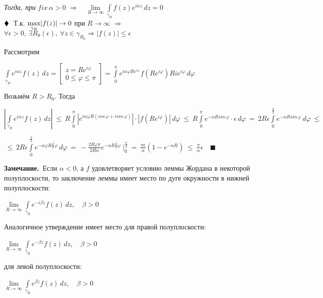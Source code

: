 \documentclass[a4paper, 12pt]{report}
\begin{document}
\bigskip \\  \textit{Тогда, при} $fix\,\alpha > 0$ \quad $\Rightarrow \quad \lim\limits_{R \rightarrow \infty} \int\limits_{\gamma_{R}} f(z)e^{i\alpha z}\, dz = 0$ 
\bigskip \\
$\blacklozenge \hspace{1 mm}$ Т.к. $\smash{\displaystyle\max_{\gamma_{R}}} |f(z)| \rightarrow 0$ при $R \rightarrow \infty$ \quad $\Rightarrow$ \ 
$\forall \epsilon > 0,\ \exists R_0(\epsilon), \ \forall z \in \gamma_{R_0} \Rightarrow |f(z)| \le \epsilon$ \par\bigskip
Рассмотрим 
\begin{center}
    $\int\limits_{\gamma_{R}} e^{i\alpha z}f(z)\, dz = \begin{bmatrix} z = Re^{i\varphi} \\ 0 \le \varphi \le \pi \end{bmatrix} = \int\limits_{0}^{\pi} e^{i \alpha\varphi R e^{i\varphi}}f(R e^{i\varphi}) R i e^{i\varphi}\, d\varphi$
\end{center}
\par Возьмём $R > R_0$. Тогда 
\begin{center}
    $|\int\limits_{\gamma_{R}} e^{i\alpha z}f(z)\, dz|\ \le\  R\int\limits_{0}^{\pi} |e^{i \alpha\varphi R (cos\,\varphi + i sin\,\varphi)}|\cdot|f(R e^{i\varphi})|\, d\varphi\  \le\ R\int\limits_{0}^{\pi} e^{- \alpha R sin\,\varphi}\cdot \epsilon\, d\varphi\ =\ 2R\epsilon \int\limits_{0}^{\frac{\pi}{2}} e^{- \alpha R sin\,\varphi}\, d\varphi\ \le\ $\par[по лемме 1]$\ \le
    \ 2R\epsilon \int\limits_{0}^{\frac{\pi}{2}} e^{- \alpha\varphi R \frac{2}{\pi}\varphi}\, d\varphi\ =\ -\frac{2R\varphi\pi}{2R\alpha} e^{-\alpha R \frac{2}{\pi} \varphi}\ \bigg|_{0}^{\frac{\pi}{2}}\ =\ \frac{\pi \epsilon}{\alpha} (1 - e^{-\alpha R})\ \le\ \frac{\pi}{\alpha}\epsilon
    \quad \blacksquare$
\end{center}
\par\bigskip
\textbf{Замечание.}\ Если $\alpha < 0$, а $f$ удовлетворяет условию леммы Жордана в некоторой полуплоскости, то заключение леммы имеет место по дуге окружности в нижней полуплоскости:
\begin{center}
    $\lim\limits_{R \rightarrow \infty} \int\limits_{\gamma_{R}} e^{-i\beta z}f(z)\, dz, \quad \beta > 0$
\end{center}
\par Аналогичное утверждение имеет место для правой полуплоскости:
\begin{center}
    $\lim\limits_{R \rightarrow \infty} \int\limits_{\gamma_{R}} e^{-\beta z}f(z)\, dz, \quad \beta > 0$
\end{center}
\par для левой полуплоскости:
\begin{center}
    $\lim\limits_{R \rightarrow \infty} \int\limits_{\gamma_{R}} e^{\beta z}f(z)\, dz, \quad \beta > 0$
\end{center}
\end{document}
